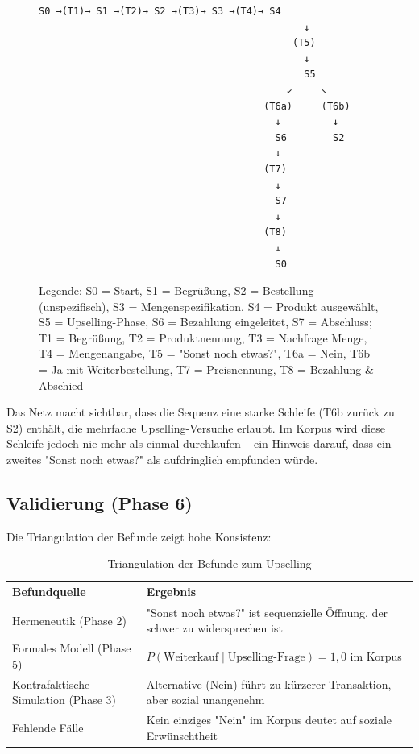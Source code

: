 \documentclass[12pt,a4paper]{article}
\begin{document}
\begin{figure}[H]
\centering
\caption{Petrinetz der Standard-Markttransaktion}
\begin{verbatim}
S0 →(T1)→ S1 →(T2)→ S2 →(T3)→ S3 →(T4)→ S4
                                              ↓
                                            (T5)
                                              ↓
                                              S5
                                           ↙     ↘
                                       (T6a)     (T6b)
                                         ↓         ↓
                                         S6        S2
                                         ↓
                                       (T7)
                                         ↓
                                         S7
                                         ↓
                                       (T8)
                                         ↓
                                         S0
\end{verbatim}
\caption*{Legende: S0 = Start, S1 = Begrüßung, S2 = Bestellung (unspezifisch), S3 = Mengenspezifikation, S4 = Produkt ausgewählt, S5 = Upselling-Phase, S6 = Bezahlung eingeleitet, S7 = Abschluss; T1 = Begrüßung, T2 = Produktnennung, T3 = Nachfrage Menge, T4 = Mengenangabe, T5 = "Sonst noch etwas?", T6a = Nein, T6b = Ja mit Weiterbestellung, T7 = Preisnennung, T8 = Bezahlung \& Abschied}
\end{figure}

Das Netz macht sichtbar, dass die Sequenz eine starke Schleife (T6b zurück zu S2) enthält, die mehrfache Upselling-Versuche erlaubt. Im Korpus wird diese Schleife jedoch nie mehr als einmal durchlaufen – ein Hinweis darauf, dass ein zweites "Sonst noch etwas?" als aufdringlich empfunden würde.

\subsection{Validierung (Phase 6)}

Die Triangulation der Befunde zeigt hohe Konsistenz:

\begin{table}[H]
\centering
\caption{Triangulation der Befunde zum Upselling}
\begin{tabular}{@{}ll@{}}
\toprule
Befundquelle & Ergebnis \\
\midrule
Hermeneutik (Phase 2) & "Sonst noch etwas?" ist sequenzielle Öffnung, der schwer zu widersprechen ist \\
Formales Modell (Phase 5) & $P(\text{Weiterkauf} \mid \text{Upselling-Frage}) = 1,0$ im Korpus \\
Kontrafaktische Simulation (Phase 3) & Alternative (Nein) führt zu kürzerer Transaktion, aber sozial unangenehm \\
Fehlende Fälle & Kein einziges "Nein" im Korpus deutet auf soziale Erwünschtheit \\
\bottomrule
\end{tabular}
\end{table}
\end{document}
